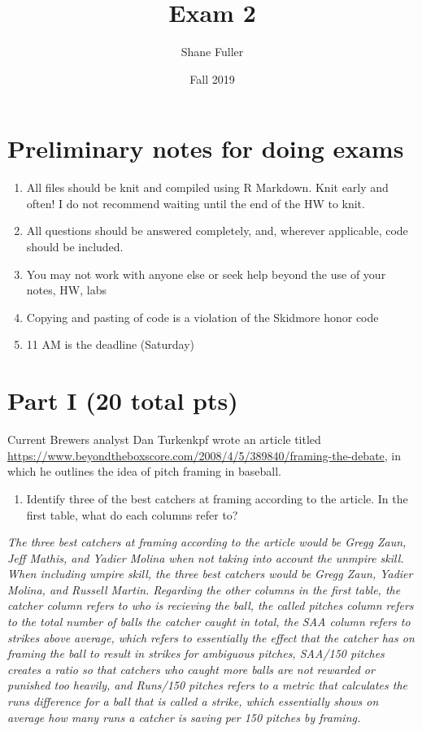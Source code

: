 \documentclass[]{article}
\title{Exam 2}
\author{Shane Fuller}
\date{Fall 2019}
\providecommand{\tightlist}{%
  \setlength{\itemsep}{0pt}\setlength{\parskip}{0pt}}
\begin{document}
\maketitle

\hypertarget{preliminary-notes-for-doing-exams}{%
\section{Preliminary notes for doing
exams}\label{preliminary-notes-for-doing-exams}}

\begin{enumerate}
\def\labelenumi{\arabic{enumi}.}
\item
  All files should be knit and compiled using R Markdown. Knit early and
  often! I do not recommend waiting until the end of the HW to knit.
\item
  All questions should be answered completely, and, wherever applicable,
  code should be included.
\item
  You may not work with anyone else or seek help beyond the use of your
  notes, HW, labs
\item
  Copying and pasting of code is a violation of the Skidmore honor code
\item
  11 AM is the deadline (Saturday)
\end{enumerate}

\hypertarget{part-i-20-total-pts}{%
\section{Part I (20 total pts)}\label{part-i-20-total-pts}}

Current Brewers analyst Dan Turkenkpf wrote an article titled
\url{https://www.beyondtheboxscore.com/2008/4/5/389840/framing-the-debate},
in which he outlines the idea of pitch framing in baseball.

\begin{enumerate}
\def\labelenumi{\arabic{enumi}.}
\tightlist
\item
  Identify three of the best catchers at framing according to the
  article. In the first table, what do each columns refer to?
\end{enumerate}

\emph{The three best catchers at framing according to the article would
be Gregg Zaun, Jeff Mathis, and Yadier Molina when not taking into
account the unmpire skill. When including umpire skill, the three best
catchers would be Gregg Zaun, Yadier Molina, and Russell Martin.
Regarding the other columns in the first table, the catcher column
refers to who is recieving the ball, the called pitches column refers to
the total number of balls the catcher caught in total, the SAA column
refers to strikes above average, which refers to essentially the effect
that the catcher has on framing the ball to result in strikes for
ambiguous pitches, SAA/150 pitches creates a ratio so that catchers who
caught more balls are not rewarded or punished too heavily, and Runs/150
pitches refers to a metric that calculates the runs difference for a
ball that is called a strike, which essentially shows on average how
many runs a catcher is saving per 150 pitches by framing.}
\end{document}
